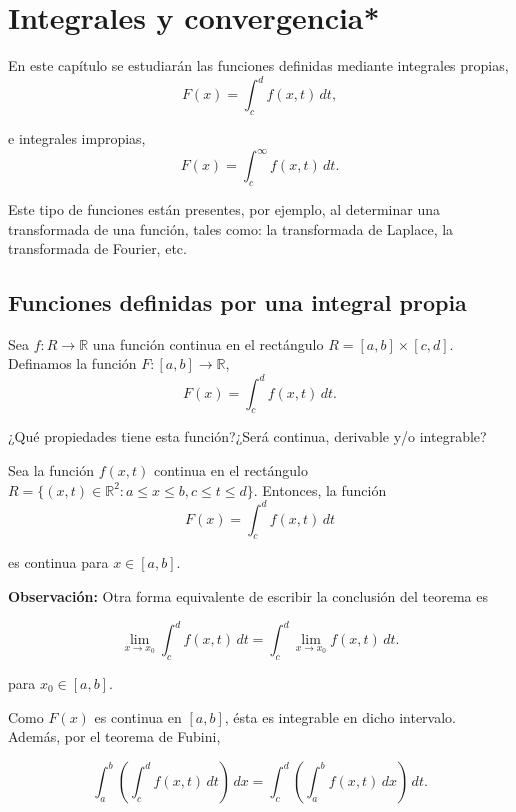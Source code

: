\chapter{Integrales y convergencia*}

En este capítulo se estudiarán las funciones definidas mediante integrales propias,
$$F(x) = \int_c^d f(x,t)\,dt,$$

e integrales impropias,
$$F(x) = \int_c^{\infty} f(x,t) \,dt.$$

Este tipo de funciones están presentes, por ejemplo, al determinar una transformada de una función, tales como: la transformada de Laplace, la transformada de Fourier, etc.

\section{Funciones definidas por una integral propia}

Sea $f: R \rightarrow \mathbb{R}$ una función continua en el rectángulo $R = [a,b] \times [c,d] $. Definamos la función $F: [a,b] \rightarrow \mathbb{R}$,
\begin{equation}
F(x) = \int_c^d f(x,t) \,dt.  \label{Funcion-Integral-Propia}
\end{equation}

¿Qué propiedades tiene esta función?¿Será continua, derivable y/o integrable?

\begin{teorema}
    Sea la función $f(x,t)$ continua en el rectángulo $R = \{(x,t) \in \mathbb{R}^2 : a \leq x \leq b, c \leq t \leq d\}$. Entonces, la función
    $$F(x) = \int_c^d f(x,t)\,dt$$

    es continua para $x \in [a,b]$.
\end{teorema}

\textbf{Observación:} Otra forma equivalente de escribir la conclusión del teorema es
\begin{shaded}
$$\lim_{x\to x_0} \int_c^d f(x,t)\,dt = \int_c^d \lim_{x\to x_0} f(x,t) \,dt.$$
\end{shaded}

para $x_0 \in [a,b]$. 

Como $F(x)$ es continua en $[a,b]$, ésta es integrable en dicho intervalo. Además, por el teorema de Fubini,
\begin{shaded}
$$\int_a^b \left(\int_c^d f(x,t) \,dt \right) \,dx = \int_c^d \left(\int_a^b f(x,t) \,dx \right) \,dt.$$
\end{shaded}

